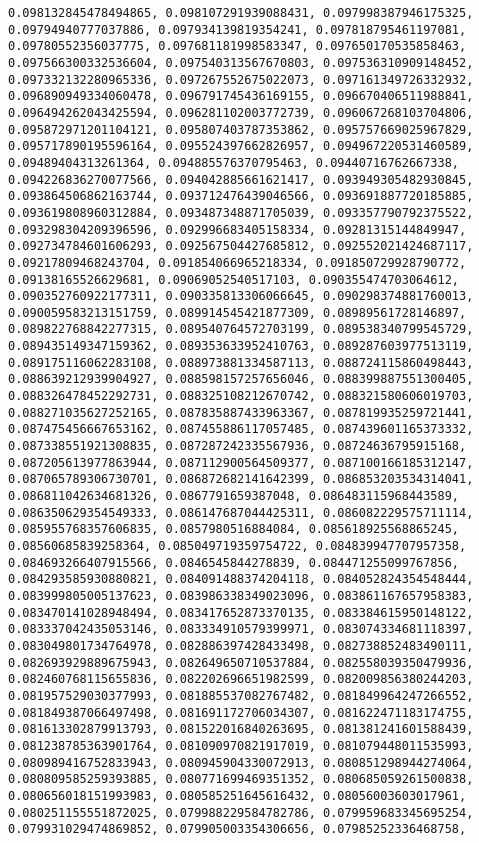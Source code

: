 \documentclass[11pt]{article}
\begin{document}
\begin{Verbatim}[commandchars=\\\{\}]
0.098132845478494865, 0.098107291939088431, 0.097998387946175325, 0.09794940777037886, 0.097934139819354241, 0.097818795461197081, 0.09780552356037775, 0.097681181998583347, 0.097650170535858463, 0.097566300332536604, 0.097540313567670803, 0.097536310909148452, 0.097332132280965336, 0.097267552675022073, 0.097161349726332932, 0.096890949334060478, 0.096791745436169155, 0.096670406511988841, 0.096494262043425594, 0.096281102003772739, 0.096067268103704806, 0.095872971201104121, 0.095807403787353862, 0.095757669025967829, 0.095717890195596164, 0.095524397662826957, 0.094967220531460589, 0.09489404313261364, 0.094885576370795463, 0.09440716762667338, 0.094226836270077566, 0.094042885661621417, 0.093949305482930845, 0.093864506862163744, 0.093712476439046566, 0.093691887720185885, 0.093619808960312884, 0.093487348871705039, 0.093357790792375522, 0.093298304209396596, 0.092996683405158334, 0.09281315144849947, 0.092734784601606293, 0.092567504427685812, 0.092552021424687117, 0.09217809468243704, 0.091854066965218334, 0.091850729928790772, 0.09138165526629681, 0.09069052540517103, 0.090355474703064612, 0.090352760922177311, 0.090335813306066645, 0.090298374881760013, 0.090059583213151759, 0.089914545421877309, 0.08989561728146897, 0.089822768842277315, 0.089540764572703199, 0.089538340799545729, 0.089435149347159362, 0.089353633952410763, 0.089287603977513119, 0.089175116062283108, 0.088973881334587113, 0.088724115860498443, 0.088639212939904927, 0.088598157257656046, 0.088399887551300405, 0.088326478452292731, 0.088325108212670742, 0.088321580606019703, 0.088271035627252165, 0.087835887433963367, 0.087819935259721441, 0.087475456667653162, 0.087455886117057485, 0.087439601165373332, 0.087338551921308835, 0.087287242335567936, 0.08724636795915168, 0.087205613977863944, 0.087112900564509377, 0.087100166185312147, 0.087065789306730701, 0.086872682141642399, 0.086853203534314041, 0.086811042634681326, 0.0867791659387048, 0.086483115968443589, 0.086350629354549333, 0.086147687044425311, 0.086082229575711114, 0.085955768357606835, 0.0857980516884084, 0.085618925568865245, 0.08560685839258364, 0.085049719359754722, 0.084839947707957358, 0.084693266407915566, 0.0846545844278839, 0.084471255099767856, 0.084293585930880821, 0.084091488374204118, 0.084052824354548444, 0.083999805005137623, 0.083986338349023096, 0.083861167657958383, 0.083470141028948494, 0.083417652873370135, 0.083384615950148122, 0.083337042435053146, 0.083334910579399971, 0.083074334681118397, 0.083049801734764978, 0.082886397428433498, 0.082738852483490111, 0.082693929889675943, 0.082649650710537884, 0.082558039350479936, 0.082460768115655836, 0.082202696651982599, 0.082009856380244203, 0.081957529030377993, 0.081885537082767482, 0.081849964247266552, 0.081849387066497498, 0.081691172706034307, 0.081622471183174755, 0.081613302879913793, 0.081522016840263695, 0.081381241601588439, 0.081238785363901764, 0.081090970821917019, 0.081079448011535993, 0.080989416752833943, 0.080945904330072913, 0.080851298944274064, 0.080809585259393885, 0.080771699469351352, 0.080685059261500838, 0.080656018151993983, 0.080585251645616432, 0.08056003603017961, 0.080251155551872025, 0.079988229584782786, 0.079959683345695254, 0.079931029474869852, 0.079905003354306656, 0.07985252336468758, 
\end{Verbatim}
\end{document}
